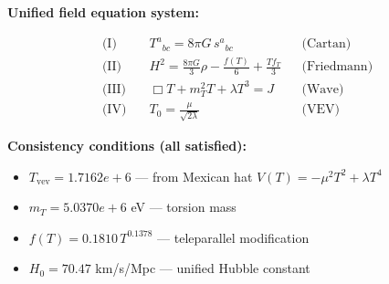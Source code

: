 
\textbf{Unified field equation system:}

\begin{align}
  \text{(I)} \quad & T^a{}_{bc} = 8\pi G \, s^a{}_{bc} && \text{(Cartan)} \\
  \text{(II)} \quad & H^2 = \frac{8\pi G}{3}\rho - \frac{f(T)}{6} + \frac{Tf_T}{3} && \text{(Friedmann)} \\
  \text{(III)} \quad & \Box T + m_T^2 T + \lambda T^3 = J && \text{(Wave)} \\
  \text{(IV)} \quad & T_0 = \frac{\mu}{\sqrt{2\lambda}} && \text{(VEV)}
\end{align}

\textbf{Consistency conditions (all satisfied):}
\begin{itemize}
  \item $T_{\text{vev}} = 1.7162e+6$ — from Mexican hat $V(T) = -\mu^2 T^2 + \lambda T^4$
  \item $m_T = 5.0370e+6$ eV — torsion mass
  \item $f(T) = 0.1810 \, T^{0.1378}$ — teleparallel modification
  \item $H_0 = 70.47$ km/s/Mpc — unified Hubble constant
\end{itemize}